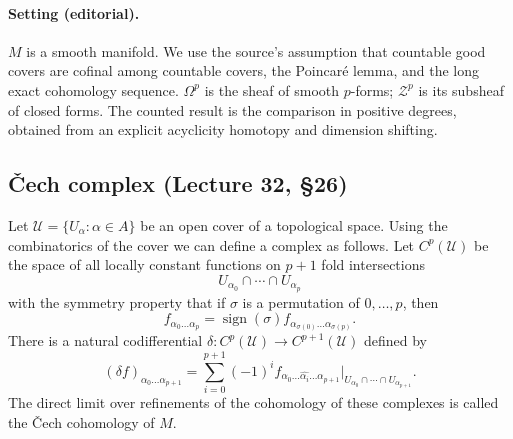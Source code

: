 
\paragraph{Setting (editorial).}
$M$ is a smooth manifold. We use the source's assumption that countable good covers are cofinal among countable covers, the Poincar\'e lemma, and the long exact cohomology sequence. $\Omega^p$ is the sheaf of smooth $p$-forms; $\mathcal Z^p$ is its subsheaf of closed forms. The counted result is the comparison in positive degrees, obtained from an explicit acyclicity homotopy and dimension shifting.

\subsection*{\v Cech complex (Lecture 32, \S26)}
Let $\mathcal U=\{U_\alpha:\alpha\in A\}$ be an open cover of a topological space. Using the combinatorics of the cover we can define a complex as follows. Let $C^p(\mathcal U)$ be the space of all locally constant functions on $p+1$ fold intersections
\[
U_{\alpha_0}\cap\cdots\cap U_{\alpha_p}
\]
with the symmetry property that if $\sigma$ is a permutation of $0,\ldots,p$, then
\[
f_{\alpha_0\ldots\alpha_p}=\operatorname{sign}(\sigma)f_{\alpha_{\sigma(0)}\ldots\alpha_{\sigma(p)}}.
\]
There is a natural codifferential $\delta:C^p(\mathcal U)\to C^{p+1}(\mathcal U)$ defined by
\[
(\delta f)_{\alpha_0\ldots\alpha_{p+1}}
=\sum_{i=0}^{p+1}(-1)^i
 f_{\alpha_0\ldots\widehat{\alpha_i}\ldots\alpha_{p+1}}
 \big|_{U_{\alpha_0}\cap\cdots\cap U_{\alpha_{p+1}}}.
\]
The direct limit over refinements of the cohomology of these complexes is called the \v Cech cohomology of $M$.

